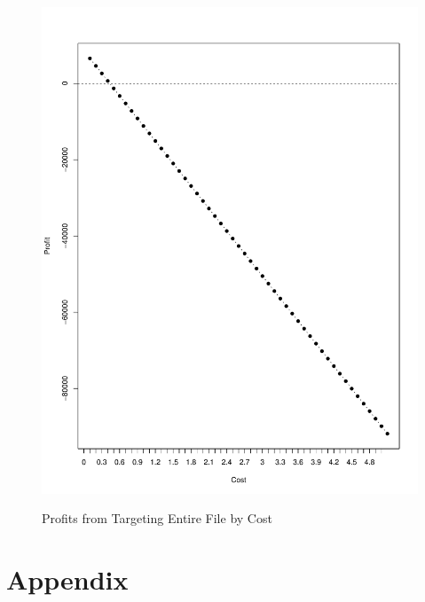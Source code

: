 \begin{figure}[!htb]
  \centering
  \caption{Profits from Targeting Entire File by Cost}
  \includegraphics[scale=.5]{Profit_Grid.pdf}
  \label{fig:Profit_Grid}
\end{figure}

\clearpage
\section{Appendix}




% 


